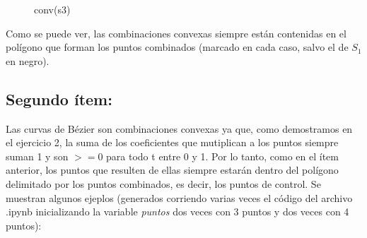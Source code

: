 \documentclass{article}
\begin{document}
\begin{figure}[H]
\begin{minipage}{0.45\textwidth}
        \caption{conv(s3)}
        \label{fig:grafico3}
    \end{minipage}
    \label{fig:tres_graficos}
\end{figure}

Como se puede ver, las combinaciones convexas siempre están contenidas en el polígono que forman los puntos combinados (marcado en cada caso, salvo el de $S_1$ en negro).

\subsection*{Segundo ítem:}
Las curvas de Bézier son combinaciones convexas ya que, como demostramos en el ejercicio 2, la suma de los coeficientes que mutiplican a los puntos siempre suman 1 y son $>=0$ para todo t entre 0 y 1. Por lo tanto, como en el ítem anterior, los puntos que resulten de ellas siempre estarán dentro del polígono delimitado por los puntos combinados, es decir, los puntos de control. Se muestran algunos ejeplos (generados corriendo varias veces el código del archivo .ipynb inicializando la variable \textit{puntos} dos veces con 3 puntos y dos veces con 4 puntos):
\end{document}
